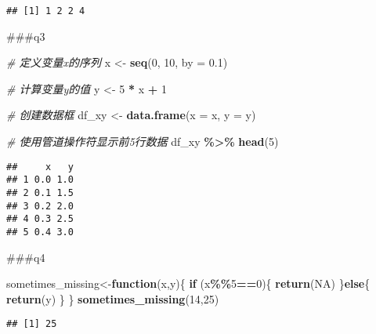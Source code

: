 \documentclass[
]{article}
\newenvironment{Shaded}{\begin{snugshade}}{\end{snugshade}}
\newcommand{\AttributeTok}[1]{\textcolor[rgb]{0.13,0.29,0.53}{#1}}
\newcommand{\CommentTok}[1]{\textcolor[rgb]{0.56,0.35,0.01}{\textit{#1}}}
\newcommand{\ConstantTok}[1]{\textcolor[rgb]{0.56,0.35,0.01}{#1}}
\newcommand{\ControlFlowTok}[1]{\textcolor[rgb]{0.13,0.29,0.53}{\textbf{#1}}}
\newcommand{\DecValTok}[1]{\textcolor[rgb]{0.00,0.00,0.81}{#1}}
\newcommand{\FloatTok}[1]{\textcolor[rgb]{0.00,0.00,0.81}{#1}}
\newcommand{\FunctionTok}[1]{\textcolor[rgb]{0.13,0.29,0.53}{\textbf{#1}}}
\newcommand{\NormalTok}[1]{#1}
\newcommand{\OtherTok}[1]{\textcolor[rgb]{0.56,0.35,0.01}{#1}}
\newcommand{\SpecialCharTok}[1]{\textcolor[rgb]{0.81,0.36,0.00}{\textbf{#1}}}
\begin{document}
\begin{verbatim}
## [1] 1 2 2 4
\end{verbatim}

\#\#\#q3

\begin{Shaded}
\begin{Highlighting}[]
\CommentTok{\# 定义变量x的序列}
\NormalTok{x }\OtherTok{\textless{}{-}} \FunctionTok{seq}\NormalTok{(}\DecValTok{0}\NormalTok{, }\DecValTok{10}\NormalTok{, }\AttributeTok{by =} \FloatTok{0.1}\NormalTok{)}

\CommentTok{\# 计算变量y的值}
\NormalTok{y }\OtherTok{\textless{}{-}} \DecValTok{5} \SpecialCharTok{*}\NormalTok{ x }\SpecialCharTok{+} \DecValTok{1}

\CommentTok{\# 创建数据框}
\NormalTok{df\_xy }\OtherTok{\textless{}{-}} \FunctionTok{data.frame}\NormalTok{(}\AttributeTok{x =}\NormalTok{ x, }\AttributeTok{y =}\NormalTok{ y)}

\CommentTok{\# 使用管道操作符显示前5行数据}
\NormalTok{df\_xy }\SpecialCharTok{\%\textgreater{}\%} \FunctionTok{head}\NormalTok{(}\DecValTok{5}\NormalTok{)}
\end{Highlighting}
\end{Shaded}

\begin{verbatim}
##     x   y
## 1 0.0 1.0
## 2 0.1 1.5
## 3 0.2 2.0
## 4 0.3 2.5
## 5 0.4 3.0
\end{verbatim}

\#\#\#q4

\begin{Shaded}
\begin{Highlighting}[]
\NormalTok{sometimes\_missing}\OtherTok{\textless{}{-}}\ControlFlowTok{function}\NormalTok{(x,y)\{}
  \ControlFlowTok{if}\NormalTok{ (x}\SpecialCharTok{\%\%}\DecValTok{5}\SpecialCharTok{==}\DecValTok{0}\NormalTok{)\{}
    \FunctionTok{return}\NormalTok{(}\ConstantTok{NA}\NormalTok{)}
\NormalTok{  \}}\ControlFlowTok{else}\NormalTok{\{}
    \FunctionTok{return}\NormalTok{(y)}
\NormalTok{  \}}
\NormalTok{\}}
\FunctionTok{sometimes\_missing}\NormalTok{(}\DecValTok{14}\NormalTok{,}\DecValTok{25}\NormalTok{)}
\end{Highlighting}
\end{Shaded}

\begin{verbatim}
## [1] 25
\end{verbatim}
\end{document}
